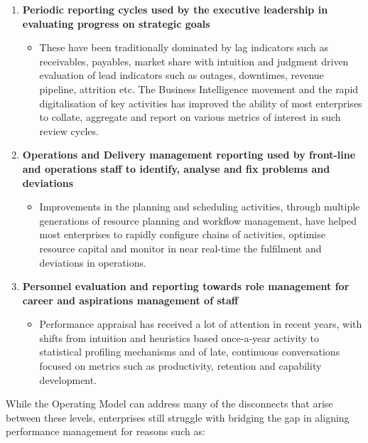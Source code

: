 \begin{enumerate}
    \item \textbf{Periodic reporting cycles used by the executive leadership in evaluating progress on strategic goals}
    \begin{itemize}
        \item These have been traditionally dominated by lag indicators such as receivables, payables, market share with
              intuition and judgment driven evaluation of lead indicators such as outages, downtimes, revenue pipeline,
              attrition etc.
              The Business Intelligence movement and the rapid digitalisation of key activities has improved the
              ability of most enterprises to collate, aggregate and report on various metrics of interest in such
              review cycles.
    \end{itemize}
    \item \textbf{Operations and Delivery management reporting used by front-line and operations staff to identify,
        analyse and fix problems and deviations}
    \begin{itemize}
        \item Improvements in the planning and scheduling activities, through multiple generations of resource planning
              and workflow management, have helped most enterprises to rapidly configure chains of activities,
              optimise resource capital and monitor in near real-time the fulfilment and deviations in operations.
    \end{itemize}
    \item \textbf{Personnel evaluation and reporting towards role management for career and aspirations management of
          staff}
    \begin{itemize}
        \item Performance appraisal has received a lot of attention in recent years, with shifts from intuition and
              heuristics based once-a-year activity to statistical profiling mechanisms and of late,
              continuous conversations focused on metrics such as productivity, retention and capability development.
    \end{itemize}
\end{enumerate}

While the Operating Model can address many of the disconnects that arise between these levels,
enterprises still struggle with bridging the gap in aligning performance management for reasons such as:

